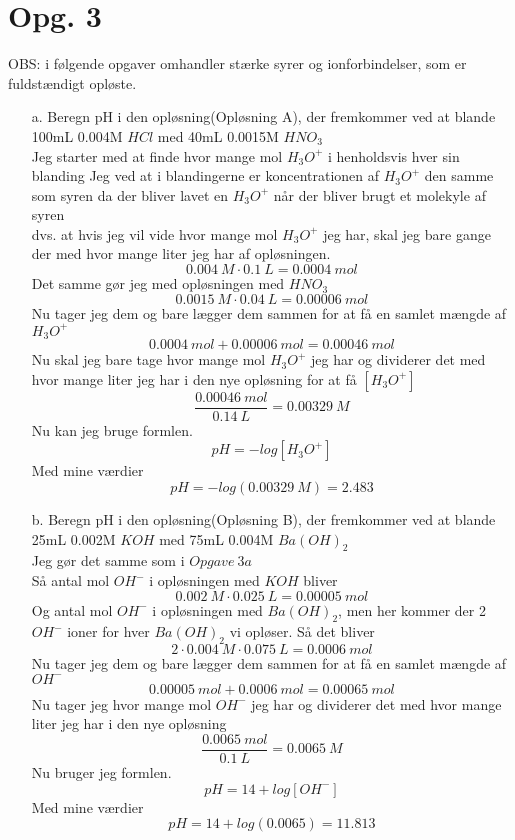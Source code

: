 \documentclass[12pt]{article}
\begin{document}
\section{Opg. 3}
OBS: i følgende opgaver omhandler stærke syrer og ionforbindelser, som er fuldstændigt opløste.
\begin{itemize}
  \item[a.] Beregn pH i den opløsning(Opløsning A), der fremkommer ved at blande 100mL 0.004M $HCl$ med 40mL 0.0015M $HNO_3$\\
  Jeg starter med at finde hvor mange mol $H_3O^+$ i henholdsvis hver sin blanding
  Jeg ved at i blandingerne er koncentrationen af $H_3O^+$ den samme som syren da der bliver lavet en $H_3O^+$ når der bliver brugt et molekyle af syren\\
  dvs. at hvis jeg vil vide hvor mange mol $H_3O^+$ jeg har, skal jeg bare gange der med hvor mange liter jeg har af opløsningen.
  $$0.004 \ M \cdot 0.1 \ L=0.0004 \ mol$$
  Det samme gør jeg med opløsningen med $HNO_3$
  $$0.0015 \ M \cdot 0.04 \ L=0.00006 \ mol$$
  Nu tager jeg dem og bare lægger dem sammen for at få en samlet mængde af $H_3O^+$
  $$0.0004 \ mol + 0.00006 \ mol=0.00046 \ mol$$
  Nu skal jeg bare tage hvor mange mol $H_3O^+$ jeg har og dividerer det med hvor mange liter jeg har i den nye opløsning for at få $[H_3O^+]$
  $$\frac{0.00046 \ mol}{0.14 \ L}=0.00329 \ M$$
  Nu kan jeg bruge formlen.
  $$pH=-log[H_3O^+]$$
  Med mine værdier
  $$pH=-log(0.00329 \ M)=2.483$$

  \item[b.] Beregn pH i den opløsning(Opløsning B), der fremkommer ved at blande 25mL 0.002M $KOH$ med 75mL 0.004M $Ba(OH)_2$\\
  Jeg gør det samme som i $Opgave \ 3a$\\
  Så antal mol $OH^{-}$ i opløsningen med $KOH$ bliver
  $$0.002 \ M \cdot 0.025 \ L=0.00005 \ mol$$
  Og antal mol $OH^{-}$ i opløsningen med $Ba(OH)_2$, men her kommer der 2 $OH^{-}$ ioner for hver $Ba(OH)_2$ vi opløser. Så det bliver
  $$2 \cdot 0.004 \ M \cdot 0.075 \ L=0.0006 \ mol$$
  Nu tager jeg dem og bare lægger dem sammen for at få en samlet mængde af $OH^{-}$
  $$0.00005 \ mol + 0.0006 \ mol=0.00065 \ mol$$
  Nu tager jeg hvor mange mol $OH^{-}$ jeg har og dividerer det med hvor mange liter jeg har i den nye opløsning
  $$\frac{0.0065 \ mol}{0.1 \ L}=0.0065 \ M$$
  Nu bruger jeg formlen.
  $$pH=14+log[OH^{-}]$$
  Med mine værdier
  $$pH=14+log(0.0065)=11.813$$


\end{itemize}
\end{document}
